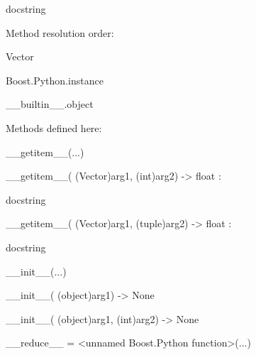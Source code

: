 \documentclass[letterpaper,10pt,english]{sphinxmanual}
\begin{document}
\begin{description}
\begin{description}
\item[{class Vector(Boost.Python.instance)}] \leavevmode
\begin{DUlineblock}{0em}
\item[] docstring
\item[] 
\item[] Method resolution order:
\item[]
\begin{DUlineblock}{\DUlineblockindent}
\item[] Vector
\item[] Boost.Python.instance
\item[] \_\_builtin\_\_.object
\item[] 
\end{DUlineblock}
\item[] Methods defined here:
\item[] 
\item[] \_\_getitem\_\_(...)
\item[]
\begin{DUlineblock}{\DUlineblockindent}
\item[] \_\_getitem\_\_( (Vector)arg1, (int)arg2) -\textgreater{} float :
\item[]
\begin{DUlineblock}{\DUlineblockindent}
\item[] docstring
\item[] 
\end{DUlineblock}
\item[] \_\_getitem\_\_( (Vector)arg1, (tuple)arg2) -\textgreater{} float :
\item[]
\begin{DUlineblock}{\DUlineblockindent}
\item[] docstring
\item[] 
\end{DUlineblock}
\end{DUlineblock}
\item[] \_\_init\_\_(...)
\item[]
\begin{DUlineblock}{\DUlineblockindent}
\item[] \_\_init\_\_( (object)arg1) -\textgreater{} None
\item[] 
\item[] \_\_init\_\_( (object)arg1, (int)arg2) -\textgreater{} None
\item[] 
\end{DUlineblock}
\item[] \_\_reduce\_\_ = \textless{}unnamed Boost.Python function\textgreater{}(...)

\end{DUlineblock}
\end{description}
\end{description}
\end{document}
